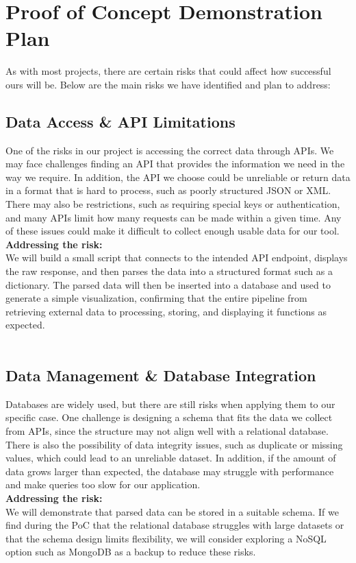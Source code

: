 \documentclass{article}
\begin{document}
\section{Proof of Concept Demonstration Plan}

As with most projects, there are certain risks that could affect how successful ours will be. Below are the main risks we have identified and plan to address:

\subsection*{Data Access \& API Limitations}\vspace{-0.5em}
One of the risks in our project is accessing the correct data through APIs. We may face challenges finding an API that provides the information we need in the way we require. In addition, the API we choose could be unreliable or return data in a format that is hard to process, such as poorly structured JSON or XML. There may also be restrictions, such as requiring special keys or authentication, and many APIs limit how many requests can be made within a given time. Any of these issues could make it difficult to collect enough usable data for our tool.
\\\textbf{Addressing the risk:}\\
We will build a small script that connects to the intended API endpoint, displays the raw response, and then parses the data into a structured format such as a dictionary. The parsed data will then be inserted into a database and used to generate a simple visualization, confirming that the entire pipeline from retrieving external data to processing, storing, and displaying it functions as expected. \\\\


\subsection*{Data Management \& Database Integration}\vspace{-0.5em}
Databases are widely used, but there are still risks when applying them to our specific case. One challenge is designing a schema that fits the data we collect from APIs, since the structure may not align well with a relational database. There is also the possibility of data integrity issues, such as duplicate or missing values, which could lead to an unreliable dataset. In addition, if the amount of data grows larger than expected, the database may struggle with performance and make queries too slow for our application.
\\\textbf{Addressing the risk:}\\
We will demonstrate that parsed data can be stored in a suitable schema. If we find during the PoC that the relational database struggles with large datasets or that the schema design limits flexibility, we will consider exploring a NoSQL option such as MongoDB as a backup to reduce these risks.
\end{document}
